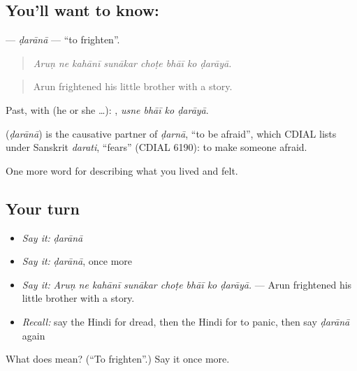 \subsection*{You'll want to know: }
\textbf{} — \emph{ḍarānā} — \textquotedblleft{}to frighten\textquotedblright{}.

\begin{quote}
       
\end{quote}

\begin{quote}
\emph{Aruṇ ne kahānī sunākar choṭe bhāī ko ḍarāyā.}
\end{quote}

\begin{quote}
Arun frightened his little brother with a story.
\end{quote}

Past, with  (he or she …):    , \emph{usne bhāī ko ḍarāyā}.

\begin{cousinweb}
\textbf{} (\emph{ḍarānā}) is the causative partner of \emph{ḍarnā}, \textquotedblleft{}to be afraid\textquotedblright{}, which CDIAL lists under Sanskrit \emph{darati}, \textquotedblleft{}fears\textquotedblright{} (CDIAL 6190): to make someone afraid.
\end{cousinweb}

\begin{grammarlens}[title={What you've built}]
One more word for describing what you lived and felt.
\end{grammarlens}

\subsection*{Your turn}
\begin{itemize}
\raggedright
  \item \emph{Say it:} \emph{ḍarānā}
  \item \emph{Say it:} \emph{ḍarānā}, once more
  \item \emph{Say it:} \emph{Aruṇ ne kahānī sunākar choṭe bhāī ko ḍarāyā.} — Arun frightened his little brother with a story.
  \item \emph{Recall:} say the Hindi for dread, then the Hindi for to panic, then say \emph{ḍarānā} again
\end{itemize}

\begin{tcolorbox}[breakable,colback=teal!4,colframe=teal!35!black,title={Before you move on}]
What does  mean? (\textquotedblleft{}To frighten\textquotedblright{}.) Say it once more.
\end{tcolorbox}
